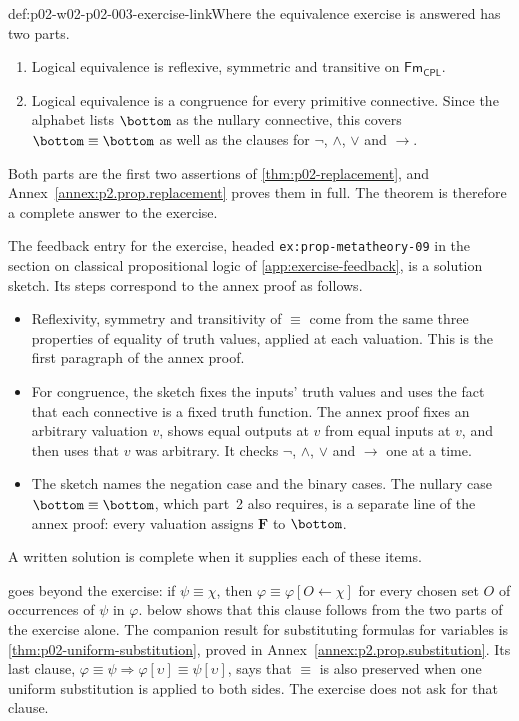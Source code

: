 \begin{hbconvention}{def:p02-w02-p02-003-exercise-link}{Where the equivalence exercise is answered}
 has two parts.
\begin{enumerate}
  \item Logical equivalence is reflexive, symmetric and transitive on
        \(\mathsf{Fm}_{\mathsf{CPL}}\).
  \item Logical equivalence is a congruence for every primitive connective.
        Since the alphabet lists \(\bottom\) as the nullary connective, this
        covers \(\bottom\equiv\bottom\) as well as the clauses for
        \(\neg\), \(\land\), \(\lor\) and \(\to\).
\end{enumerate}
Both parts are the first two assertions of \cref{thm:p02-replacement}, and
Annex~\ref{annex:p2.prop.replacement} proves them in full.  The theorem is
therefore a complete answer to the exercise.

The feedback entry for the exercise, headed \texttt{ex:prop-metatheory-09} in
the section on classical propositional logic of
\cref{app:exercise-feedback}, is a solution sketch.  Its steps correspond to
the annex proof as follows.
\begin{itemize}
  \item Reflexivity, symmetry and transitivity of \(\equiv\) come from the
        same three properties of equality of truth values, applied at each
        valuation.  This is the first paragraph of the annex proof.
  \item For congruence, the sketch fixes the inputs' truth values and uses
        the fact that each connective is a fixed truth function.  The annex
        proof fixes an arbitrary valuation \(v\), shows equal outputs at
        \(v\) from equal inputs at \(v\), and then uses that \(v\) was
        arbitrary.  It checks \(\neg\), \(\land\), \(\lor\) and \(\to\) one at
        a time.
  \item The sketch names the negation case and the binary cases.  The
        nullary case \(\bottom\equiv\bottom\), which part~2 also requires,
        is a separate line of the annex proof: every valuation assigns
        \(\mathbf F\) to \(\bottom\).
\end{itemize}
A written solution is complete when it supplies each of these items.

 goes beyond the exercise: if \(\psi\equiv\chi\),
then \(\varphi\equiv\varphi[O\leftarrow\chi]\) for every chosen set \(O\) of
occurrences of \(\psi\) in \(\varphi\).
 below shows that this
clause follows from the two parts of the exercise alone.  The companion
result for substituting formulas for variables is
\cref{thm:p02-uniform-substitution}, proved in
Annex~\ref{annex:p2.prop.substitution}.  Its last clause,
\(\varphi\equiv\psi\Rightarrow\varphi[\upsilon]\equiv\psi[\upsilon]\), says
that \(\equiv\) is also preserved when one uniform substitution is applied to
both sides.  The exercise does not ask for that clause.
\end{hbconvention}

